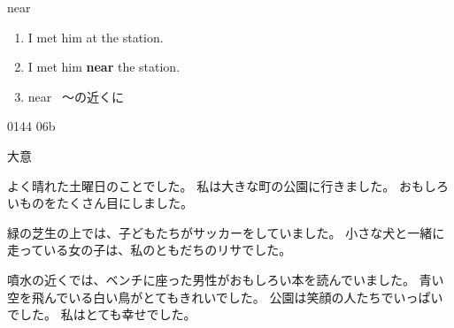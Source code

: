 \documentclass[aspectratio=169,xcolor={dvipsnames,table}]{beamer}
\begin{document}
\begin{frame}[plain]{near}
  \hypertarget{NEAR}{}

  \begin{enumerate}
    \item I met him at the station.
    \item I met him \textbf{near} the station.
    \item near  \, ～の近くに
  \end{enumerate}

  {\tiny 0144}\,{\scriptsize {}}\,{\tiny 06b}

  \hfill\hyperlink{READING}{}
\end{frame}
\begin{frame}[plain]{大意}

  \begin{tcolorbox}\zw
    よく晴れた土曜日のことでした。
    私は大きな町の公園に行きました。
    おもしろいものをたくさん目にしました。

    緑の芝生の上では、子どもたちがサッカーをしていました。
    小さな犬と一緒に走っている女の子は、私のともだちのリサでした。

    噴水の近くでは、ベンチに座った男性がおもしろい本を読んでいました。
    青い空を飛んでいる白い鳥がとてもきれいでした。
    公園は笑顔の人たちでいっぱいでした。
    私はとても幸せでした。
  \end{tcolorbox}
\end{frame}
\end{document}
